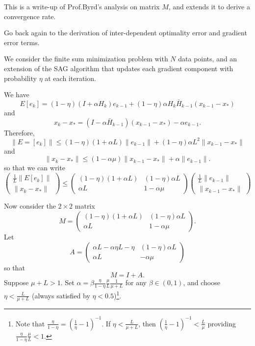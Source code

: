 \documentclass{article}
\begin{document}
 
\noindent

This is a write-up of Prof.Byrd's analysis on matrix $M$, and extends it to derive a convergence rate.

\bigskip

Go back again to the derivation of inter-dependent optimality error and gradient error terms.

We consider the finite sum minimization problem with $N$ data points, and an extension of the SAG algorithm that updates each gradient component with probability $\eta$ at each iteration.

We have 
\[
  E[e_k]=(1-\eta)(I+\alpha H_k)e_{k-1} + (1-\eta)\alpha H_k\bar H_{k-1}(x_{k-1}-x_\ast)
\]
and
\[
x_k-x_\ast=(I-\alpha\bar H_{k-1})(x_{k-1}-x_\ast) -\alpha e_{k-1}.
\]
Therefore,
\[
  \|E=[e_k]\|\leq(1-\eta)(1+\alpha L)\|e_{k-1}\| + (1-\eta)\alpha L^2\|x_{k-1}-x_\ast\|
\]
and
\[
\|x_k-x_\ast\|\leq(1-\alpha\mu)\|x_{k-1}-x_\ast\| +\alpha \|e_{k-1}\|.
\]
so that we can write
\[
 \begin{pmatrix} \displaystyle\frac{1}{L}\|E[e_k]\| \\
  \|x_k-x_\ast\|
 \end{pmatrix} \leq 
 \begin{pmatrix} (1-\eta)(1+\alpha L) & (1-\eta)\alpha L\\  
                   \alpha L  & 1-\alpha\mu \end{pmatrix}                  
 \begin{pmatrix} \displaystyle\frac{1}{L}\|e_{k-1}\| \\
  \|x_{k-1}-x_\ast\|
 \end{pmatrix}                  
\]

\bigskip
Now consider the $2\times 2$ matrix
\[
M = \begin{pmatrix} (1-\eta)(1+\alpha L) & (1-\eta)\alpha L\\  
                   \alpha L  & 1-\alpha\mu \end{pmatrix}.    
\]
Let 
\[
A = \begin{pmatrix} \alpha L-\alpha\eta L-\eta & (1-\eta)\alpha L\\  
                   \alpha L  & -\alpha\mu \end{pmatrix}  
\]
so that
\[
 M = I + A.
\]
Suppose $\mu+L>1$.  Set $\alpha = \beta \displaystyle\frac{\eta}{1-\eta}\frac{\mu}{L}\frac{1}{\mu+L}$ for any $\beta\in (0,1)$, and choose \ $\displaystyle\eta<\frac{L}{\mu+L}$ (always satisfied by $\eta<0.5$)\footnote{Note that $\frac{\eta}{1-\eta}=(\frac{1}{\eta}-1)^{-1}$.  If $\eta<\frac{L}{\mu+L}$, then $(\frac{1}{\eta}-1)^{-1}<\frac{L}{\mu}$ providing $\frac{\eta}{1-\eta} \frac{\mu}{L}<1$. }.
\end{document}
